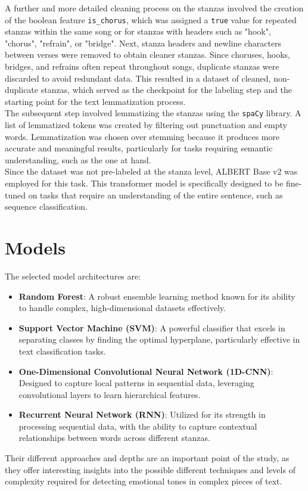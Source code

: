 A further and more detailed cleaning process on the stanzas involved the creation
of the boolean feature \texttt{is\_chorus}, which was assigned a \texttt{true}
value for repeated stanzas within the same song or for stanzas with headers such
as "hook", "chorus", "refrain", or "bridge".
Next, stanza headers and newline characters between verses were removed to obtain
cleaner stanzas.
Since choruses, hooks, bridges, and refrains often repeat throughout songs,
duplicate stanzas were discarded to avoid redundant data. This resulted in a
dataset of cleaned, non-duplicate stanzas, which served as the checkpoint for
the labeling step and the starting point for the text lemmatization process.\\

The subsequent step involved lemmatizing the stanzas using the \texttt{spaCy}
library. A list of lemmatized tokens was created by filtering out punctuation
and empty words. Lemmatization was chosen over stemming because it produces
more accurate and meaningful results, particularly for tasks requiring semantic
understanding, such as the one at hand.\\

Since the dataset was not pre-labeled at the stanza level, ALBERT Base v2 was employed for this task.
This transformer model is specifically designed to be fine-tuned on tasks that
require an understanding of the entire sentence, such as sequence classification.

\section*{Models}
The selected model architectures are:
\begin{itemize} 
    \item \textbf{Random Forest}: A robust ensemble learning method known for
    its ability to handle complex, high-dimensional datasets effectively.
    \item \textbf{Support Vector Machine (SVM)}: A powerful classifier that
    excels in separating classes by finding the optimal hyperplane,
    particularly effective in text classification tasks.
    \item \textbf{One-Dimensional Convolutional Neural Network (1D-CNN)}:
    Designed to capture local patterns in sequential data, leveraging
    convolutional layers to learn hierarchical features.
    \item \textbf{Recurrent Neural Network (RNN)}: Utilized for its strength
    in processing sequential data, with the ability to capture contextual
    relationships between words across different stanzas.
\end{itemize}
Their different approaches and depths are an important point of the study, as they
offer interesting insights into the possible different techniques and levels of
complexity required for detecting emotional tones in complex pieces of text.

